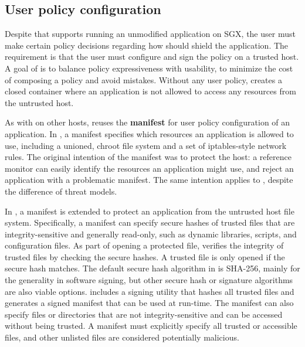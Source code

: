 \subsection{User policy configuration}
\label{sec:sgx:overview:config}


Despite that \graphenesgx{} supports running an unmodified application on SGX,
the user must make certain policy decisions
regarding how \graphenesgx{} should shield the application.
The requirement is that
the user must configure and sign the policy on a trusted host.
A goal of \graphenesgx{} is to balance policy expressiveness
with usability,
to minimize the cost of composing a policy and avoid mistakes.
Without any user policy, \graphenesgx{} creates a closed container
where an application
is not allowed to access any resources
from the untrusted host.


As with \graphene{} on other hosts,
\graphenesgx{} reuses the {\bf manifest} for user policy configuration of an application.
In \graphene{},
a manifest specifies which resources an application is allowed to use, including
a unioned, chroot file system
and a set of iptables-style network rules.
The original intention of the manifest was to protect the host:
a reference monitor
can easily identify the resources an application might use, and reject an application
with a problematic manifest.
The same intention
applies to \graphenesgx{}, despite the difference of threat models.


In \graphenesgx{}, a manifest is extended to protect an application from the untrusted host file system.
Specifically, a manifest can specify secure hashes of trusted files that are integrity-sensitive and generally read-only,
such as dynamic libraries, scripts, and configuration files.
As part of opening a protected file,
\graphenesgx{} verifies the integrity of trusted files by checking the secure hashes.
A trusted file is only opened if the secure hash matches.
The default secure hash algorithm
in \graphenesgx{} is SHA-256, mainly for the generality in software signing,
but other secure hash or signature algorithms
are also viable options.
\graphenesgx{} includes a signing utility that hashes all trusted files and generates a signed manifest that can be used at run-time.
The manifest can also specify files or directories that
are not integrity-sensitive
and can be accessed without being trusted.
A manifest must explicitly specify all trusted or accessible files,
and other unlisted files
are considered potentially malicious.



